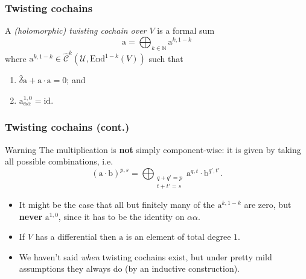 \documentclass{beamer}
\begin{document}
            \begin{frame}\frametitle{Twisting cochains}
                \begin{definition}
                    A \emph{(holomorphic) twisting cochain over $V$} is a formal sum
                    \begin{equation*}
                        \mathrm{a} = \bigoplus_{k\in\mathbb{N}} \mathrm{a}^{k,1-k}
                    \end{equation*}
                    where $\mathrm{a}^{k,1-k}\in\hat{\mathscr{C}}^k(\mathcal{U},\mathrm{End}^{1-k}(V))$ such that
                    \begin{enumerate}
                        \item $\hat{\delta}\mathrm{a} + \mathrm{a}\cdot\mathrm{a} = 0$; and
                        \item $\mathrm{a}_{\alpha\alpha}^{1,0}=\mathrm{id}$.
                    \end{enumerate}
                \end{definition}
            \end{frame}

            \begin{frame}\frametitle{Twisting cochains (cont.)}
                \begin{alertblock}{Warning}
                    The multiplication is \textbf{not} simply component-wise: it is given by taking all possible combinations, i.e.
                    \begin{equation*}
                        (\mathrm{a}\cdot\mathrm{b})^{p,s} = \bigoplus_{\substack{q+q'=p\\t+t'=s}} \mathrm{a}^{q,t}\cdot\mathrm{b}^{q',t'}.
                    \end{equation*}
                \end{alertblock}

                \pause
                
                \begin{itemize}
                    \item It might be the case that all but finitely many of the $\mathrm{a}^{k,1-k}$ are zero, but \textbf{never} $\mathrm{a}^{1,0}$, since it has to be the identity on $\alpha\alpha$.
                    \pause
                    \item If $V$ has a differential then $\mathrm{a}$ is an element of total degree $1$.
                    \pause
                    \item We haven't said \emph{when} twisting cochains exist, but under pretty mild assumptions they always do (by an inductive construction).
                \end{itemize}
            \end{frame}
\end{document}
